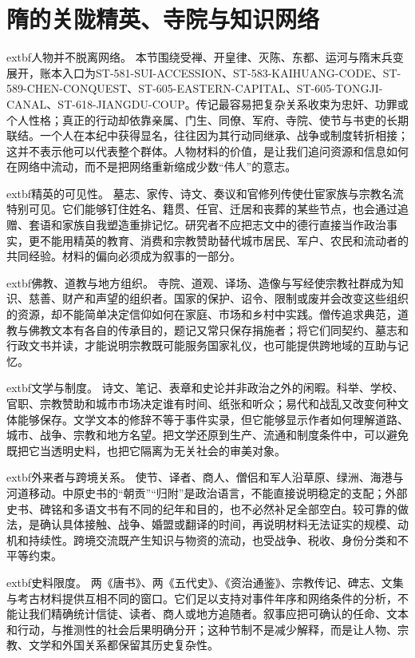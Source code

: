 \section{隋的关陇精英、寺院与知识网络}
\label{sec:sui-elite-networks-religion}

\noindent	extbf{人物并不脱离网络。} 本节围绕受禅、开皇律、灭陈、东都、运河与隋末兵变展开，账本入口为ST-581-SUI-ACCESSION、ST-583-KAIHUANG-CODE、ST-589-CHEN-CONQUEST、ST-605-EASTERN-CAPITAL、ST-605-TONGJI-CANAL、ST-618-JIANGDU-COUP。传记最容易把复杂关系收束为忠奸、功罪或个人性格；真正的行动却依靠亲属、门生、同僚、军府、寺院、使节与书吏的长期联结。一个人在本纪中获得显名，往往因为其行动同继承、战争或制度转折相接；这并不表示他可以代表整个群体。人物材料的价值，是让我们追问资源和信息如何在网络中流动，而不是把网络重新缩成少数“伟人”的意志。

\noindent	extbf{精英的可见性。} 墓志、家传、诗文、奏议和官修列传使仕宦家族与宗教名流特别可见。它们能够钉住姓名、籍贯、任官、迁居和丧葬的某些节点，也会通过追赠、套语和家族自我塑造重排记忆。研究者不应把志文中的德行直接当作政治事实，更不能用精英的教育、消费和宗教赞助替代城市居民、军户、农民和流动者的共同经验。材料的偏向必须成为叙事的一部分。

\noindent	extbf{佛教、道教与地方组织。} 寺院、道观、译场、造像与写经使宗教社群成为知识、慈善、财产和声望的组织者。国家的保护、诏令、限制或废并会改变这些组织的资源，却不能简单决定信仰如何在家庭、市场和乡村中实践。僧传追求典范，道教与佛教文本有各自的传承目的，题记又常只保存捐施者；将它们同契约、墓志和行政文书并读，才能说明宗教既可能服务国家礼仪，也可能提供跨地域的互助与记忆。

\noindent	extbf{文学与制度。} 诗文、笔记、表章和史论并非政治之外的闲暇。科举、学校、官职、宗教赞助和城市市场决定谁有时间、纸张和听众；易代和战乱又改变何种文体能够保存。文学文本的修辞不等于事件实录，但它能够显示作者如何理解道路、城市、战争、宗教和地方名望。把文学还原到生产、流通和制度条件中，可以避免既把它当透明史料，也把它隔离为无关社会的审美对象。

\noindent	extbf{外来者与跨境关系。} 使节、译者、商人、僧侣和军人沿草原、绿洲、海港与河道移动。中原史书的“朝贡”“归附”是政治语言，不能直接说明稳定的支配；外部史书、碑铭和多语文书有不同的纪年和目的，也不必然补足全部空白。较可靠的做法，是确认具体接触、战争、婚盟或翻译的时间，再说明材料无法证实的规模、动机和持续性。跨境交流既产生知识与物资的流动，也受战争、税收、身份分类和不平等约束。

\noindent	extbf{史料限度。} 两《唐书》、两《五代史》、《资治通鉴》、宗教传记、碑志、文集与考古材料提供互相不同的窗口。它们足以支持对事件年序和网络条件的分析，不能让我们精确统计信徒、读者、商人或地方追随者。叙事应把可确认的任命、文本和行动，与推测性的社会后果明确分开；这种节制不是减少解释，而是让人物、宗教、文学和外国关系都保留其历史复杂性。

